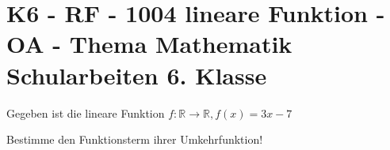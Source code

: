 \section{K6 - RF - 1004 lineare Funktion - OA - Thema Mathematik Schularbeiten 6. Klasse}

\begin{beispiel}[K6 - RF]{1} %
			Gegeben ist die lineare Funktion $f\!:\mathbb{R}\rightarrow\mathbb{R}, f(x)=3x-7$
			
			Bestimme den Funktionsterm ihrer Umkehrfunktion!\leer
			
							\end{beispiel}